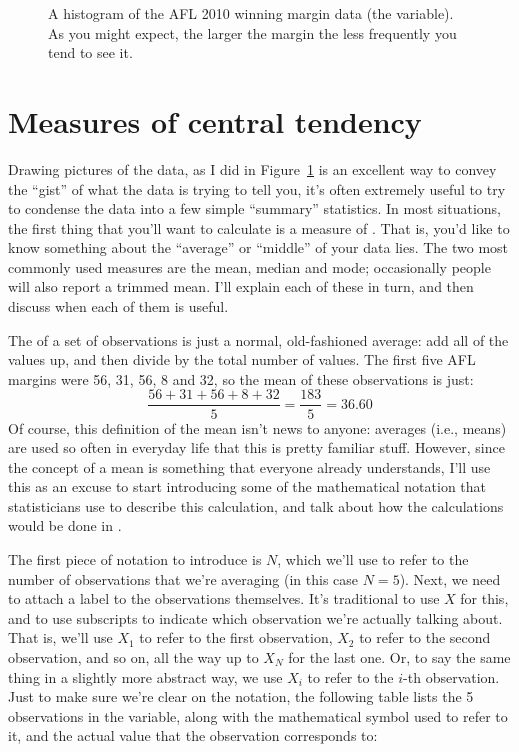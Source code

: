 \vspace*{1cm}
\begin{figure}[h]
\begin{center}
\caption{A histogram of the AFL 2010 winning margin data (the  variable). As you might expect, the larger the margin the less frequently you tend to see it.}
\label{fig:histogram1}
\HR
\end{center}
\end{figure}

\section{Measures of central tendency~\label{sec:centraltendency}}

Drawing pictures of the data, as I did in Figure~\ref{fig:histogram1} is an excellent way to convey the ``gist'' of what the data is trying to tell you, it's often extremely useful to try to condense the data into a few simple ``summary'' statistics. In most situations, the first thing that you'll want to calculate is a measure of . That is, you'd like to know something about the ``average'' or ``middle'' of your data lies. The two most commonly used measures are the mean, median and mode; occasionally people will also report a trimmed mean. I'll explain each of these in turn, and then discuss when each of them is useful.


The  of a set of observations is just a normal, old-fashioned average: add all of the values up, and then divide by the total number of values. The first five AFL margins were 56, 31, 56, 8 and 32, so the mean of these observations is just:
$$
\frac{56 + 31 + 56 + 8 + 32}{5} = \frac{183}{5} = 36.60
$$
Of course, this definition of the mean isn't news to anyone: averages (i.e., means) are used so often in everyday life that this is pretty familiar stuff. However, since the concept of a mean is something that everyone already understands, I'll use this as an excuse to start introducing some of the mathematical notation that statisticians use to describe this calculation, and talk about how the calculations would be done in \R. 

The first piece of notation to introduce is $N$, which we'll use to refer to the number of observations that we're averaging (in this case $N = 5$). Next, we need to attach a label to the observations themselves. It's traditional to use $X$ for this, and to use subscripts to indicate which observation we're actually talking about. That is, we'll use $X_1$ to refer to the first observation, $X_2$ to refer to the second observation, and so on, all the way up to $X_N$ for the last one. Or, to say the same thing in a slightly more abstract way, we use $X_i$ to refer to the $i$-th observation. Just to make sure we're clear on the notation, the following table lists the 5 observations in the  variable, along with the mathematical symbol used to refer to it, and the actual value that the observation corresponds to:

